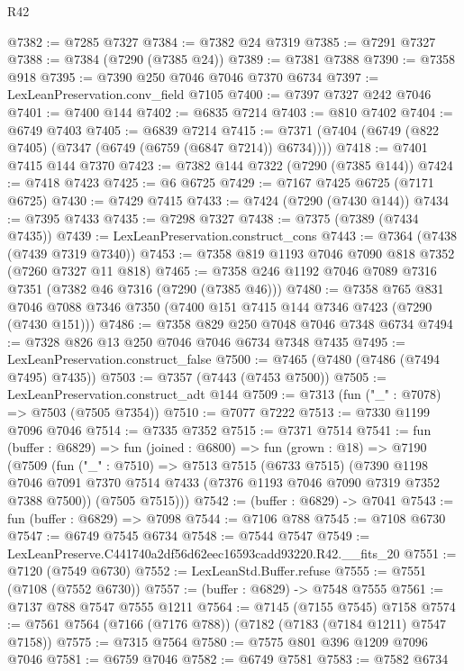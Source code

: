 \begin{lexlean}{R42}
\begin{coremodule}
{@7382 := @7285 @7327
@7384 := @7382 @24 @7319
@7385 := @7291 @7327
@7388 := @7384 (@7290 (@7385 @24))
@7389 := @7381 @7388
@7390 := @7358 @918
@7395 := @7390 @250 @7046 @7046 @7370 @6734
@7397 := LexLeanPreservation.conv_field @7105
@7400 := @7397 @7327 @242 @7046
@7401 := @7400 @144
@7402 := @6835 @7214
@7403 := @810 @7402
@7404 := @6749 @7403
@7405 := @6839 @7214
@7415 := @7371 (@7404 (@6749 (@822 @7405) (@7347 (@6749 (@6759 (@6847 @7214)) @6734))))
@7418 := @7401 @7415 @144 @7370
@7423 := @7382 @144 @7322 (@7290 (@7385 @144))
@7424 := @7418 @7423
@7425 := @6 @6725
@7429 := @7167 @7425 @6725 (@7171 @6725)
@7430 := @7429 @7415
@7433 := @7424 (@7290 (@7430 @144))
@7434 := @7395 @7433
@7435 := @7298 @7327
@7438 := @7375 (@7389 (@7434 @7435))
@7439 := LexLeanPreservation.construct_cons
@7443 := @7364 (@7438 (@7439 @7319 @7340))
@7453 := @7358 @819 @1193 @7046 @7090 @818 @7352 (@7260 @7327 @11 @818)
@7465 := @7358 @246 @1192 @7046 @7089 @7316 @7351 (@7382 @46 @7316 (@7290 (@7385 @46)))
@7480 := @7358
    @765
    @831
    @7046
    @7088
    @7346
    @7350
    (@7400 @151 @7415 @144 @7346 @7423 (@7290 (@7430 @151)))
@7486 := @7358 @829 @250 @7048 @7046 @7348 @6734
@7494 := @7328 @826 @13 @250 @7046 @7046 @6734 @7348 @7435
@7495 := LexLeanPreservation.construct_false
@7500 := @7465 (@7480 (@7486 (@7494 @7495) @7435))
@7503 := @7357 (@7443 (@7453 @7500))
@7505 := LexLeanPreservation.construct_adt @144
@7509 := @7313 (fun ("_" : @7078) => @7503 (@7505 @7354))
@7510 := @7077 @7222
@7513 := @7330 @1199 @7096 @7046
@7514 := @7335 @7352
@7515 := @7371 @7514
@7541 := fun (buffer : @6829) =>
  fun (joined : @6800) =>
  fun (grown : @18) =>
  @7190
    (@7509
      (fun ("_" : @7510) =>
      @7513
        @7515
        (@6733 @7515)
        (@7390
          @1198
          @7046
          @7091
          @7370
          @7514
          @7433
          (@7376 @1193 @7046 @7090 @7319 @7352 @7388 @7500))
        (@7505 @7515)))
@7542 := (buffer : @6829) -> @7041
@7543 := fun (buffer : @6829) => @7098
@7544 := @7106 @788
@7545 := @7108 @6730
@7547 := @6749 @7545 @6734
@7548 := @7544 @7547
@7549 := LexLeanPreserve.C441740a2df56d62eec16593cadd93220.R42.__fits_20
@7551 := @7120 (@7549 @6730)
@7552 := LexLeanStd.Buffer.refuse
@7555 := @7551 (@7108 (@7552 @6730))
@7557 := (buffer : @6829) -> @7548 @7555
@7561 := @7137 @788 @7547 @7555 @1211
@7564 := @7145 (@7155 @7545) @7158
@7574 := @7561 @7564 (@7166 (@7176 @788)) (@7182 (@7183 (@7184 @1211) @7547 @7158))
@7575 := @7315 @7564
@7580 := @7575 @801 @396 @1209 @7096 @7046
@7581 := @6759 @7046
@7582 := @6749 @7581
@7583 := @7582 @6734
}
\end{coremodule}
\end{lexlean}
